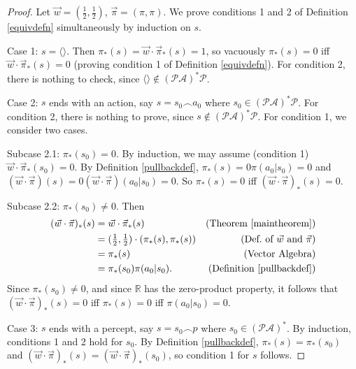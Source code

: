 \documentclass[runningheads]{llncs}
\begin{document}
\begin{proof}
    Let $\vec w=(\frac12,\frac12)$, $\vec\pi=(\pi,\pi)$.
    We prove conditions 1 and 2 of Definition \ref{equivdefn}
    simultaneously by induction on $s$.
 
    Case 1: $s=\langle\rangle$. Then
    $\pi_*(s)=\vec w\cdot\vec\pi_*(s)=1$, so
    vacuously $\pi_*(s)=0$ iff $\vec w\cdot\vec\pi_*(s)=0$
    (proving condition 1 of
    Definition \ref{equivdefn}).
    For condition 2, there is nothing to check, since
    $\langle\rangle\not\in(\mathcal P\mathcal A)^*\mathcal P$.

    Case 2: $s$ ends with an action, say $s=s_0\frown a_0$ where
        $s_0\in(\mathcal P\mathcal A)^*\mathcal P$.
        For condition 2, there is nothing to prove, since
        $s\not\in(\mathcal P\mathcal A)^*\mathcal P$.
        For condition 1, we consider two cases.

        Subcase 2.1: $\pi_*(s_0)=0$.
        By induction, we may assume (condition 1)
        $\vec w\cdot\vec\pi_*(s_0)=0$.
        By Definition \ref{pullbackdef},
        $\pi_*(s)=0\pi(a_0|s_0)=0$
        and $(\vec w\cdot\vec\pi)(s)=0(\vec w\cdot\vec\pi)(a_0|s_0)=0$.
        So $\pi_*(s)=0$ iff $(\vec w\cdot\vec\pi)_*(s)=0$.

        Subcase 2.2: $\pi_*(s_0)\not=0$.
        Then
        \begin{align*}
            (\vec w\cdot \vec\pi)_*(s)
                &= \vec w\cdot\vec\pi_*(s)
                    &\mbox{(Theorem \ref{maintheorem})}\\
                &= (\mbox{$\frac12$},\mbox{$\frac12$})\cdot(\pi_*(s),\pi_*(s))
                    &\mbox{(Def.\ of $\vec w$ and $\vec\pi$)}\\
                &= \pi_*(s)
                    &\mbox{(Vector Algebra)}\\
                &= \pi_*(s_0)\pi(a_0|s_0).
                    &\mbox{(Definition \ref{pullbackdef})}
        \end{align*}
        Since $\pi_*(s_0)\not=0$, and since $\mathbb R$ has the zero-product property,
        it follows that
        $(\vec w\cdot\vec\pi)_*(s)=0$ iff $\pi_*(s)=0$ iff $\pi(a_0|s_0)=0$.

    Case 3: $s$ ends with a percept, say
        $s=s_0\frown p$ where $s_0\in (\mathcal P\mathcal A)^*$.
        By induction, conditions 1 and 2 hold for $s_0$.
        By Definition \ref{pullbackdef},
        $\pi_*(s)=\pi_*(s_0)$ and $(\vec w\cdot\vec\pi)_*(s)=(\vec w\cdot\vec\pi)_*(s_0)$,
        so condition 1 for $s$ follows.


\end{proof}
\end{document}
